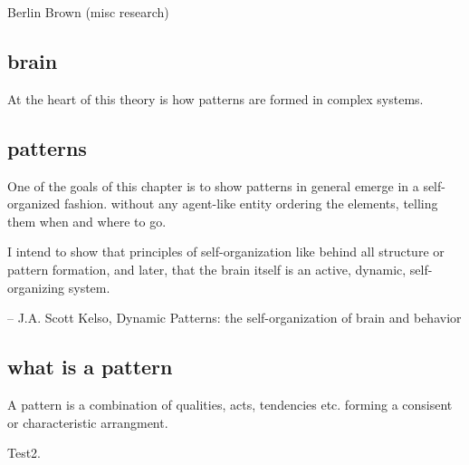 \documentclass{article}
\begin{document}
\begin{center}
Berlin Brown (misc research)
\end{center}

\subsection{brain}
At the heart of this theory is how patterns
are formed  in complex systems.

\subsection{patterns}
One of the goals of this chapter is to show
patterns in general emerge in a self-organized fashion.
without any agent-like entity ordering the elements,
telling them when and where to go.

I intend to show that principles of self-organization
like behind all structure or pattern formation, and later,
that the brain itself is an active, dynamic, self-organizing
system.

-- J.A. Scott Kelso, Dynamic Patterns: the self-organization of brain and behavior

\subsection{what is a pattern}

A pattern is a combination of qualities, acts, tendencies etc.
forming a consisent or characteristic arrangment.


\vspace{5 mm}
Test2.
\end{document}
